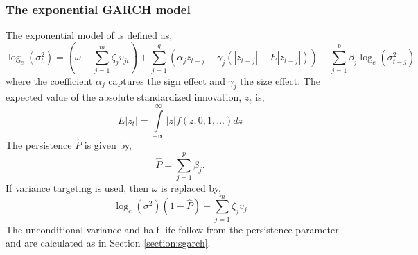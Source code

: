 \subsubsection{The exponential GARCH model}\label{section:egarch}
The exponential model of \citet{Nelson} is defined as,
\begin{equation}\label{eq:egarch}
{\log _e}\left( {\sigma _t^2} \right) = \left( {\omega  + \sum\limits_{j = 1}^m {{\zeta _j}{v_{jt}}} } \right) + \sum\limits_{j = 1}^q {\left( {{\alpha _j}{z_{t - j}} + {\gamma _j}\left( {\left| {{z_{t - j}}} \right| - E\left| {{z_{t - j}}} \right|} \right)} \right) + } \sum\limits_{j = 1}^p {{\beta _j}{{\log }_e}\left( {\sigma _{t - j}^2} \right)}
\end{equation}
where the coefficient $\alpha_j$ captures the sign effect and $\gamma_j$ the
size effect. The expected value of the absolute standardized innovation, $z_t$
is,
\begin{equation}\label{eq:egarchE}
E\left| {{z_t}} \right| = \int\limits_{ - \infty }^\infty  {\left| z \right|} f\left( {z,0,1,...} \right)dz
\end{equation}
The persistence $\hat P$ is given by,
\begin{equation}\label{eq:egarchp}
\hat P = \sum\limits_{j = 1}^p {{\beta _j}}.
\end{equation}
If variance targeting is used, then $\omega$ is replaced by,
\begin{equation}\label{eq:egarchvt}
{\log _e}\left( {{{\bar \sigma }^2}} \right)\left( {1 - \hat P} \right) - \sum\limits_{j = 1}^m {{\zeta _j}{{\bar v}_j}}
\end{equation}
The unconditional variance and half life follow from the persistence parameter
and are calculated as in Section \ref{section:sgarch}.

